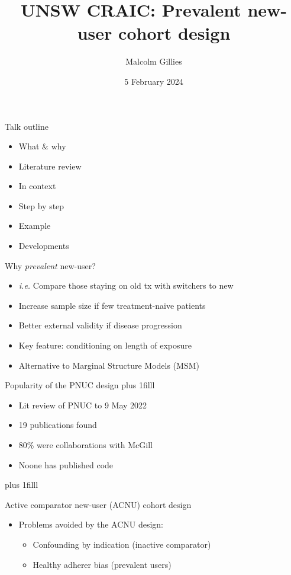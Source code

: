 \documentclass[aspectratio=169,12pt]{beamer} %
\title{UNSW CRAIC: Prevalent new-user cohort design}
\author{Malcolm Gillies}
\institute{\url{https://github.com/mbg-unsw/pnuc}}
\date{5 February 2024}
\begin{document}
{
\begin{frame}
\titlepage
\end{frame}
}

\begin{frame}{Talk outline}
    \begin{itemize}
	\item What \& why
	\item Literature review
	\item In context
	\item Step by step
	\item Example
	\item Developments
    \end{itemize}
\end{frame}

\begin{frame}{Why \emph{prevalent} new-user?}
    \begin{itemize}
	\item \emph{i.e.} Compare those staying on old tx with switchers to new
	\item Increase sample size if few treatment-naive patients
	\item Better external validity if disease progression
	\item Key feature: conditioning on length of exposure
	\item Alternative to Marginal Structure Models (MSM)
    \end{itemize}
\end{frame}

\begin{frame}{Popularity of the PNUC design}
\vskip0pt plus 1filll
\begin{itemize}
	\item Lit review of PNUC to 9 May 2022
	\item 19 publications found
	\item 80\% were collaborations with McGill
	\item Noone has published code
\end{itemize}
\vskip0pt plus 1filll
\end{frame}

\begin{frame}{Active comparator new-user (ACNU) cohort design}
    \begin{itemize}
	\item Problems avoided by the ACNU design:
	\begin{itemize}
		\item Confounding by indication (inactive comparator)
		\item Healthy adherer bias (prevalent users)
	\end{itemize}
    \end{itemize}
\end{frame}
\end{document}
